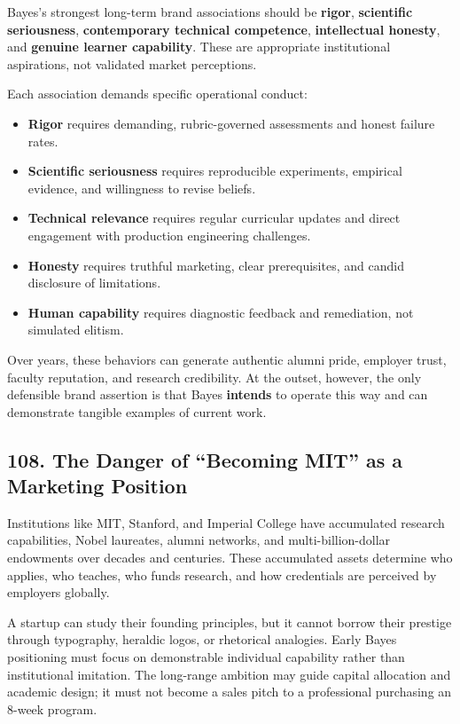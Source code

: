 Bayes's strongest long-term brand associations should be \textbf{rigor}, \textbf{scientific seriousness}, \textbf{contemporary technical competence}, \textbf{intellectual honesty}, and \textbf{genuine learner capability}. These are appropriate institutional aspirations, not validated market perceptions.

Each association demands specific operational conduct:
\begin{itemize}
    \item \textbf{Rigor} requires demanding, rubric-governed assessments and honest failure rates.
    \item \textbf{Scientific seriousness} requires reproducible experiments, empirical evidence, and willingness to revise beliefs.
    \item \textbf{Technical relevance} requires regular curricular updates and direct engagement with production engineering challenges.
    \item \textbf{Honesty} requires truthful marketing, clear prerequisites, and candid disclosure of limitations.
    \item \textbf{Human capability} requires diagnostic feedback and remediation, not simulated elitism.
\end{itemize}

Over years, these behaviors can generate authentic alumni pride, employer trust, faculty reputation, and research credibility. At the outset, however, the only defensible brand assertion is that Bayes \textbf{intends} to operate this way and can demonstrate tangible examples of current work.

\subsection*{108. The Danger of ``Becoming MIT'' as a Marketing Position}

Institutions like MIT, Stanford, and Imperial College have accumulated research capabilities, Nobel laureates, alumni networks, and multi-billion-dollar endowments over decades and centuries. These accumulated assets determine who applies, who teaches, who funds research, and how credentials are perceived by employers globally.

A startup can study their founding principles, but it cannot borrow their prestige through typography, heraldic logos, or rhetorical analogies. Early Bayes positioning must focus on demonstrable individual capability rather than institutional imitation. The long-range ambition may guide capital allocation and academic design; it must not become a sales pitch to a professional purchasing an 8-week program.

